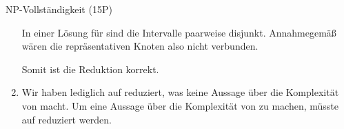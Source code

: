 \documentclass{article}
\begin{document}
\begin{exercise}{NP-Vollständigkeit (15P)}
\begin{solution}
\begin{enumerate}
            In einer Lösung für  sind die Intervalle paarweise disjunkt. Annahmegemäß wären die repräsentativen Knoten also nicht verbunden.\par
            Somit ist die Reduktion korrekt.
      \item Wir haben lediglich  auf  reduziert, was keine Aussage über die Komplexität von  macht. Um eine Aussage über die Komplexität von  zu machen, müsste  auf  reduziert werden.
    \end{enumerate}
  \end{solution}
\end{exercise}
\end{document}
